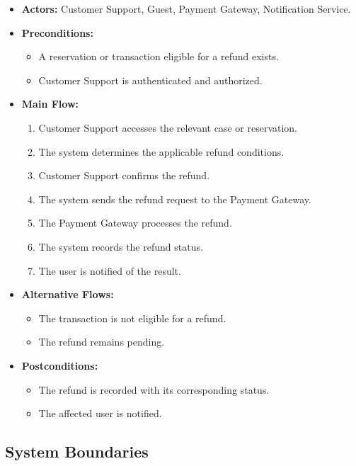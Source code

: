 \begin{itemize}
    \item \textbf{Actors:} Customer Support, Guest, Payment Gateway, Notification Service.
    
    \item \textbf{Preconditions:}
    \begin{itemize}
        \item A reservation or transaction eligible for a refund exists.
        \item Customer Support is authenticated and authorized.
    \end{itemize}
    
    \item \textbf{Main Flow:}
    \begin{enumerate}
        \item Customer Support accesses the relevant case or reservation.
        \item The system determines the applicable refund conditions.
        \item Customer Support confirms the refund.
        \item The system sends the refund request to the Payment Gateway.
        \item The Payment Gateway processes the refund.
        \item The system records the refund status.
        \item The user is notified of the result.
    \end{enumerate}
    
    \item \textbf{Alternative Flows:}
    \begin{itemize}
        \item The transaction is not eligible for a refund.
        \item The refund remains pending.
    \end{itemize}
    
    \item \textbf{Postconditions:}
    \begin{itemize}
        \item The refund is recorded with its corresponding status.
        \item The affected user is notified.
    \end{itemize}
\end{itemize}


\subsection{System Boundaries}

